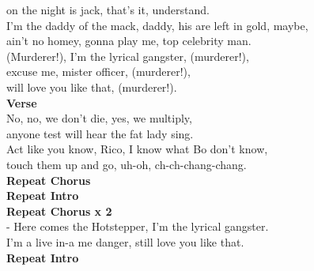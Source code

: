 on the night is jack, that’s it, understand.\\
I’m the daddy of the mack, daddy, his are left in gold, maybe,\\
ain’t no homey, gonna play me, top celebrity man.\\
(Murderer!), I’m the lyrical gangster, (murderer!),\\
excuse me, mister officer, (murderer!),\\
will love you like that, (murderer!).\\
\textbf{Verse}\\
No, no, we don’t die, yes, we multiply,\\
anyone test will hear the fat lady sing.\\
Act like you know, Rico,   I know what Bo don’t know,\\
touch them up and go, uh-oh,  ch-ch-chang-chang.\\
\textbf{Repeat Chorus}\\
\textbf{Repeat Intro}\\
\textbf{Repeat Chorus x 2}   \\                -                                   
Here comes the Hotstepper, I’m the lyrical gangster.\\
I’m a live in-a me danger, still love you like that.\\
\textbf{Repeat Intro}\\

